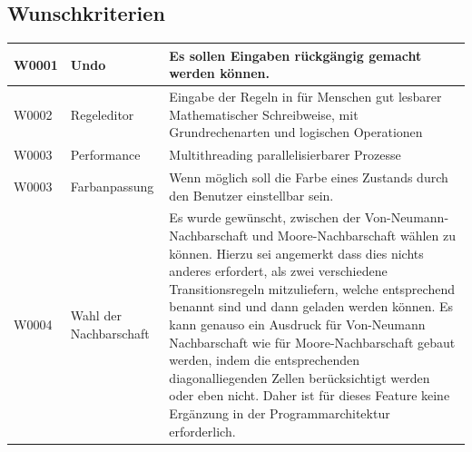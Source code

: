 \documentclass[11pt,a4paper]{article}
\begin{document}

\subsection{Wunschkriterien}
\begin{longtable}[m]{|m{2.2cm}|m{4cm}|m{8cm}|}
\hline
W0001 & Undo & Es sollen Eingaben rückgängig gemacht werden können.\\
\hline
W0002 & Regeleditor & Eingabe der Regeln in für Menschen gut lesbarer Mathematischer Schreibweise, mit Grundrechenarten und logischen Operationen\\
\hline
W0003 & Performance & Multithreading parallelisierbarer Prozesse\\
\hline
W0003 &Farbanpassung & Wenn möglich soll die Farbe eines Zustands durch den Benutzer einstellbar sein.\\
\hline
W0004 & Wahl der Nachbarschaft & Es wurde gewünscht, zwischen der Von-Neumann-Nachbarschaft und Moore-Nachbarschaft wählen zu können. Hierzu sei angemerkt dass dies nichts anderes erfordert, als zwei verschiedene Transitionsregeln mitzuliefern, welche entsprechend benannt sind und dann geladen werden können. Es kann genauso ein Ausdruck für Von-Neumann Nachbarschaft wie für Moore-Nachbarschaft gebaut werden, indem die entsprechenden diagonalliegenden Zellen berücksichtigt werden oder eben nicht. Daher ist für dieses Feature keine Ergänzung in der Programmarchitektur erforderlich.\\
\hline
\end{longtable}
\end{document}
